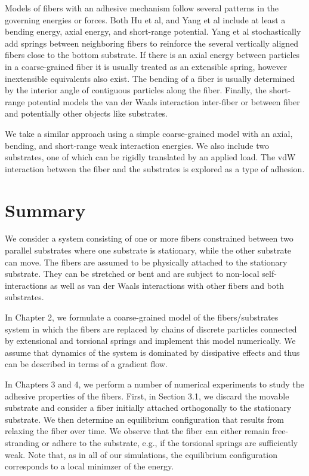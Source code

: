 	Models of fibers with an adhesive mechanism follow several patterns in the governing energies or forces. Both Hu et al, and Yang et al include at least a bending energy, axial energy, and short-range potential. Yang et al stochastically add springs between neighboring fibers to reinforce the several vertically aligned fibers close to the bottom substrate. If there is an axial energy between particles in a coarse-grained fiber it is usually treated as an extensible spring, however inextensible equivalents also exist. The bending of a fiber is usually determined by the interior angle of contiguous particles along the fiber. Finally, the short-range potential models the van der Waals interaction inter-fiber or between fiber and potentially other objects like substrates. 

	We take a similar approach using a simple coarse-grained model with an axial, bending, and short-range weak interaction energies. We also include two substrates, one of which can be rigidly translated by an applied load. The vdW interaction between the fiber and the substrates is explored as a type of adhesion.
	
\section{Summary}

We consider a system consisting of one or more fibers constrained between two parallel substrates where one substrate is stationary, while the other substrate can move. 
The fibers are assumed to be physically attached to the stationary substrate. 
They can be stretched or bent and are subject to non-local self-interactions as well as van der Waals interactions with other fibers and both substrates. 

In Chapter 2, we formulate a coarse-grained model of the fibers/substrates system in which the fibers are replaced by chains of discrete particles connected by extensional and torsional springs and implement this model numerically. 
We assume that dynamics of the system is dominated by dissipative effects and thus can be described in terms of a gradient flow. 

In Chapters 3 and 4, we perform a number of numerical experiments to study the adhesive properties of the fibers. 
First, in Section 3.1, we discard the movable substrate and consider a fiber initially attached orthogonally to the stationary substrate. 
We then determine an equilibrium configuration that results from relaxing the fiber over time. 
We observe that the fiber can either remain free-stranding or adhere to the substrate, e.g., if the torsional springs are sufficiently weak. 
Note that, as in all of our simulations, the equilibrium configuration corresponds to a local minimzer of the energy.


